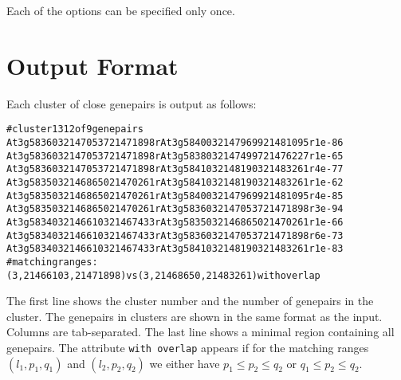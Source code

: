 \documentclass[12pt]{article}
\begin{document}
\begin{Justshowoptions}





\end{Justshowoptions}

\noindent
Each of the options can be specified only once.

\section{Output Format}
Each cluster of close genepairs is output as follows:
\begin{small}
\begin{alltt}
# cluster 1312 of 9 genepairs
At3g58360 3 21470537 21471898 r At3g58400 3 21479699 21481095 r 1e-86
At3g58360 3 21470537 21471898 r At3g58380 3 21474997 21476227 r 1e-65
At3g58360 3 21470537 21471898 r At3g58410 3 21481903 21483261 r 4e-77
At3g58350 3 21468650 21470261 r At3g58410 3 21481903 21483261 r 1e-62
At3g58350 3 21468650 21470261 r At3g58400 3 21479699 21481095 r 4e-85
At3g58350 3 21468650 21470261 r At3g58360 3 21470537 21471898 r 3e-94
At3g58340 3 21466103 21467433 r At3g58350 3 21468650 21470261 r 1e-66
At3g58340 3 21466103 21467433 r At3g58360 3 21470537 21471898 r 6e-73
At3g58340 3 21466103 21467433 r At3g58410 3 21481903 21483261 r 1e-83
# matching ranges: (3,21466103,21471898) vs (3,21468650,21483261) with overlap
\end{alltt}
\end{small}
The first line shows the cluster number and the number of genepairs in the
cluster. The genepairs in clusters are shown in the same format
as the input. Columns are tab-separated.
The last line shows a minimal region containing all genepairs. The 
attribute \texttt{with overlap} appears if for the matching ranges
$(l_{1},p_{1},q_{1})$ and $(l_{2},p_{2},q_{2})$ we either have
\(p_{1}\leq p_{2}\leq q_{2}\) or 
\(q_{1}\leq p_{2}\leq q_{2}\).
\end{document}
